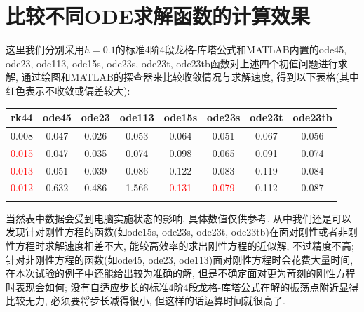 \documentclass[a4paper, 12pt]{ctexart}
\let\oldtable\table
\let\oldendtable\endtable
\renewenvironment{table}
    {\par\nolinenumbers\oldtable}
    {\oldendtable\endnolinenumbers\par}
\theoremstyle{plain}
\theoremstyle{plain}
\theoremstyle{plain}
\theoremstyle{nonumberplain}
\begin{document}
    \section{比较不同ODE求解函数的计算效果}

    这里我们分别采用$h=0.1$的标准4阶4段龙格-库塔公式和MATLAB内置的ode45, ode23, ode113, ode15s, ode23s, ode23t, ode23tb函数对上述四个初值问题进行求解, 通过绘图和MATLAB的探查器来比较收敛情况与求解速度, 得到以下表格(其中红色表示不收敛或偏差较大):
    \begin{table}[H]
        \begin{center}
            \caption{不同ODE求解函数的计算时间(单位: $\mathrm{s}$)}
            \begin{tabular}{cccccccc}
                \Xhline{1.2pt}
                rk44 & ode45 & ode23 & ode113 & ode15s & ode23s & ode23t & ode23tb\\
                \hline
                0.008 & 0.047 & 0.026 & 0.053 & 0.064 & 0.051 & 0.067 & 0.056\\
                \textcolor{red}{0.015} & 0.047 & 0.035 & 0.074 & 0.098 & 0.065 & 0.091 & 0.074\\
                \textcolor{red}{0.013} & 0.051 & 0.039 & 0.086 & 0.122 & 0.083 & 0.119 & 0.084\\
                \textcolor{red}{0.012} & 0.632 & 0.486 & 1.566 & \textcolor{red}{0.131} & \textcolor{red}{0.079} & 0.112 & 0.087\\
                \Xhline{1.2pt}
            \end{tabular}
        \end{center}
    \end{table}

    当然表中数据会受到电脑实施状态的影响, 具体数值仅供参考. 从中我们还是可以发现针对刚性方程的函数(如ode15s, ode23s, ode23t, ode23tb)在面对刚性或者非刚性方程时求解速度相差不大, 能较高效率的求出刚性方程的近似解, 不过精度不高; 针对非刚性方程的函数(如ode45, ode23, ode113)面对刚性方程时会花费大量时间, 在本次试验的例子中还能给出较为准确的解, 但是不确定面对更为苛刻的刚性方程时表现会如何; 没有自适应步长的标准4阶4段龙格-库塔公式在解的振荡点附近显得比较无力, 必须要将步长减得很小, 但这样的话运算时间就很高了.



\end{document}
